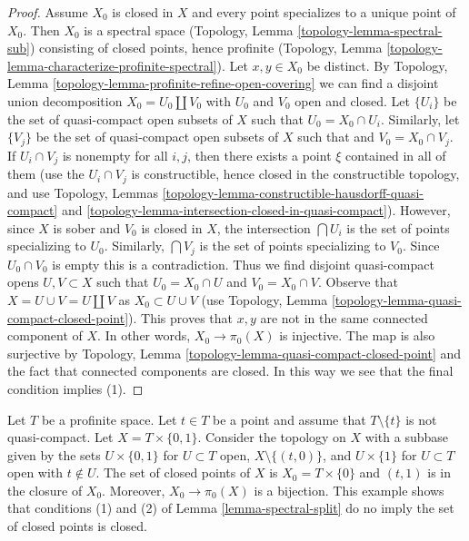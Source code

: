 \begin{proof}
\medskip\noindent
Assume $X_0$ is closed in $X$ and every point specializes to a unique
point of $X_0$. Then $X_0$ is a spectral space
(Topology, Lemma \ref{topology-lemma-spectral-sub})
consisting of closed points, hence profinite
(Topology, Lemma \ref{topology-lemma-characterize-profinite-spectral}).
Let $x, y \in X_0$ be distinct. By
Topology, Lemma \ref{topology-lemma-profinite-refine-open-covering}
we can find a disjoint union decomposition
$X_0 = U_0 \amalg V_0$ with $U_0$ and $V_0$ open and closed.
Let $\{U_i\}$ be the set of quasi-compact open subsets of $X$
such that $U_0 = X_0 \cap U_i$. Similarly, let $\{V_j\}$ be the
set of quasi-compact open subsets of $X$ such that
and $V_0 = X_0 \cap V_j$. If $U_i \cap V_j$ is nonempty for all $i, j$,
then there exists a point $\xi$ contained in all of them
(use the $U_i \cap V_j$ is constructible, hence closed in the
constructible topology, and use
Topology, Lemmas \ref{topology-lemma-constructible-hausdorff-quasi-compact} and
\ref{topology-lemma-intersection-closed-in-quasi-compact}).
However, since $X$ is sober and $V_0$ is closed in $X$,
the intersection $\bigcap U_i$ is the set of points specializing to $U_0$.
Similarly, $\bigcap V_j$ is the set of points specializing to $V_0$.
Since $U_0 \cap V_0$ is empty this is a contradiction.
Thus we find disjoint quasi-compact opens $U, V \subset X$
such that $U_0 = X_0 \cap U$ and $V_0 = X_0 \cap V$.
Observe that $X = U \cup V = U \amalg V$ as
$X_0 \subset U \cup V$ (use
Topology, Lemma \ref{topology-lemma-quasi-compact-closed-point}).
This proves that $x, y$ are not in the same connected component of $X$.
In other words, $X_0 \to \pi_0(X)$ is injective. The map is also
surjective by
Topology, Lemma \ref{topology-lemma-quasi-compact-closed-point}
and the fact that connected components are closed.
In this way we see that the final condition implies (1).
\end{proof}

\begin{example}
\label{example-not-w-local}
Let $T$ be a profinite space. Let $t \in T$ be a point and assume
that $T \setminus \{t\}$ is not quasi-compact.
Let $X = T \times \{0, 1\}$. Consider the topology on $X$
with a subbase given by the sets
$U \times \{0, 1\}$ for $U \subset T$ open, $X \setminus \{(t, 0)\}$,
and $U \times \{1\}$ for $U \subset T$ open with $t \not \in U$.
The set of closed points of $X$ is $X_0 = T \times \{0\}$ and
$(t, 1)$ is in the closure of $X_0$.
Moreover, $X_0 \to \pi_0(X)$ is a bijection.
This example shows that conditions (1) and (2) of
Lemma \ref{lemma-spectral-split} do no imply the set of closed points
is closed.
\end{example}

